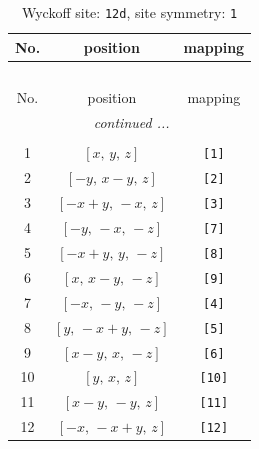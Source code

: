 \documentclass[fleqn,8pt]{jsarticle}
\begin{document}
\renewcommand{\arraystretch}{1.2}
\begin{longtable}{ccc}
\caption{Wyckoff site: {\tt 12d}, site symmetry: {\tt 1}}
 \\
 \hline \hline
No. & position & mapping \\ \hline \endfirsthead

\multicolumn{2}{l}{\tablename\ \thetable{}} \\
 \hline \hline
No. & position & mapping \\ \hline \endhead

 \hline \hline
\multicolumn{2}{r}{\footnotesize\it continued ...} \\ \endfoot

 \hline \hline
\multicolumn{2}{r}{} \\ \endlastfoot

1 & $\left[ x,\, y,\, z \right]$ & {\tt [1]} \\ \hline
2 & $\left[ - y,\, x - y,\, z \right]$ & {\tt [2]} \\ \hline
3 & $\left[ - x + y,\, - x,\, z \right]$ & {\tt [3]} \\ \hline
4 & $\left[ - y,\, - x,\, - z \right]$ & {\tt [7]} \\ \hline
5 & $\left[ - x + y,\, y,\, - z \right]$ & {\tt [8]} \\ \hline
6 & $\left[ x,\, x - y,\, - z \right]$ & {\tt [9]} \\ \hline
7 & $\left[ - x,\, - y,\, - z \right]$ & {\tt [4]} \\ \hline
8 & $\left[ y,\, - x + y,\, - z \right]$ & {\tt [5]} \\ \hline
9 & $\left[ x - y,\, x,\, - z \right]$ & {\tt [6]} \\ \hline
10 & $\left[ y,\, x,\, z \right]$ & {\tt [10]} \\ \hline
11 & $\left[ x - y,\, - y,\, z \right]$ & {\tt [11]} \\ \hline
12 & $\left[ - x,\, - x + y,\, z \right]$ & {\tt [12]} \\
\end{longtable}
\end{document}
